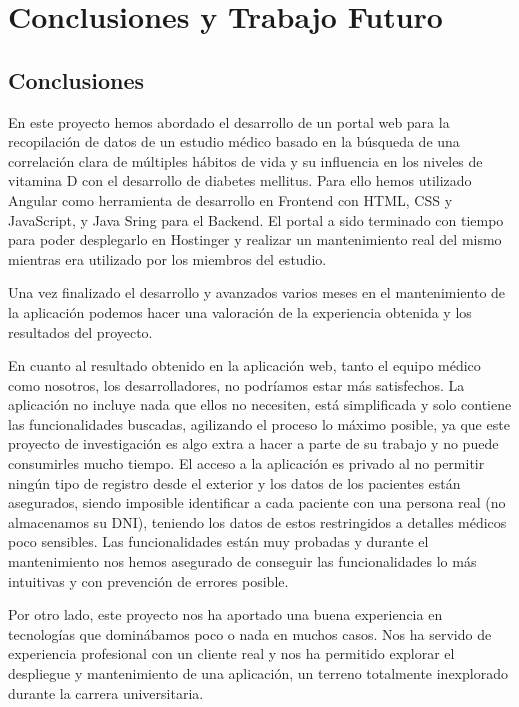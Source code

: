 \chapter{Conclusiones y Trabajo Futuro}
    \section{Conclusiones}
    En este proyecto hemos abordado el desarrollo de un portal web para la recopilación de datos de un estudio médico basado en la búsqueda de una correlación clara de múltiples hábitos de vida y su influencia en los niveles de vitamina D con el desarrollo de diabetes mellitus. Para ello hemos utilizado Angular como herramienta de desarrollo en Frontend con HTML, CSS y JavaScript, y Java Sring para el Backend. El portal a sido terminado con tiempo para poder desplegarlo en Hostinger y realizar un mantenimiento real del mismo mientras era utilizado por los miembros del estudio. \newline
    
    Una vez finalizado el desarrollo y avanzados varios meses en el mantenimiento de la aplicación podemos hacer una valoración de la experiencia obtenida y los resultados del proyecto.
    \newline
    
    En cuanto al resultado obtenido en la aplicación web, tanto el equipo médico como nosotros, los desarrolladores, no podríamos estar más satisfechos. La aplicación no incluye nada que ellos no necesiten, está simplificada y solo contiene las funcionalidades buscadas, agilizando el proceso lo máximo posible, ya que este proyecto de investigación es algo extra a hacer a parte de su trabajo y no puede consumirles mucho tiempo.   El acceso a la aplicación es privado al no permitir ningún tipo de registro desde el exterior y los datos de los pacientes están asegurados, siendo imposible identificar a cada paciente con una persona real (no almacenamos su DNI), teniendo los datos de estos restringidos a detalles médicos poco sensibles. Las funcionalidades están muy probadas y durante el mantenimiento nos hemos asegurado de conseguir las funcionalidades lo más intuitivas y con prevención de errores posible.
    \newline
    
    Por otro lado, este proyecto nos ha aportado una buena experiencia en tecnologías que dominábamos poco o nada en muchos casos. Nos ha servido de experiencia profesional con un cliente real y nos ha permitido explorar el despliegue y mantenimiento de una aplicación, un terreno totalmente inexplorado durante la carrera universitaria.
    \newline
    
